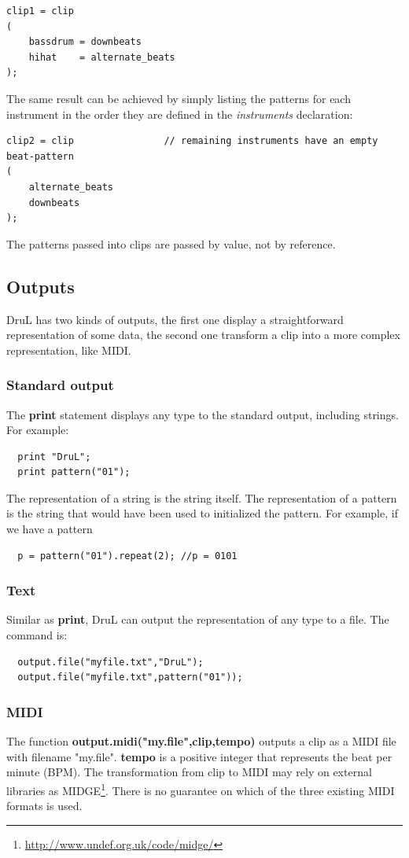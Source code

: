 \documentclass[11pt,twoside]{article}
\begin{document}
\begin{verbatim}
clip1 = clip
(
    bassdrum = downbeats
    hihat    = alternate_beats
);
\end{verbatim}
The same result can be achieved by simply listing the patterns for each instrument in the order they are defined in the \textit{instruments} declaration:
\begin{verbatim}
clip2 = clip				// remaining instruments have an empty beat-pattern
(
    alternate_beats
    downbeats    
);

\end{verbatim}
The patterns passed into clips are passed by value, not by reference.



\subsection{Outputs}
DruL has two kinds of outputs, the first one display a straightforward
representation of some data, the second one transform a clip into a
more complex representation, like MIDI.

\subsubsection{Standard output}
The \textbf{print} statement displays any type to the standard
output, including strings. For example:
\begin{verbatim}
  print "DruL";
  print pattern("01");
\end{verbatim}
The representation of a string is the string itself. The representation
of a pattern is the string that would have been used to initialized
the pattern. For example, if we have a pattern
\begin{verbatim}
  p = pattern("01").repeat(2); //p = 0101
\end{verbatim}

\subsubsection{Text}
Similar as \textbf{print}, DruL can output the representation of any type 
to a file. The command is:
\begin{verbatim}
  output.file("myfile.txt","DruL");
  output.file("myfile.txt",pattern("01"));
\end{verbatim}

\subsubsection{MIDI}
The function \textbf{output.midi("my.file",clip,tempo)} outputs a clip as a MIDI
file with filename "my.file". \textbf{tempo} is a positive integer that
represents the beat per minute (BPM). 
The transformation from clip to MIDI may rely
on external libraries as MIDGE\footnote{\url{http://www.undef.org.uk/code/midge/}}. There is no guarantee on which of the three existing MIDI formats is used.
\end{document}
